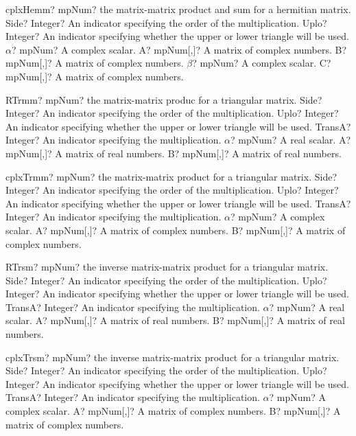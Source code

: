 \documentclass[12pt,a4paper,openany]{book}
\begin{document}
\begin{mpFunctionsExtract}
\mpFunctionSeven
{cplxHemm? mpNum? the matrix-matrix product and sum for a hermitian matrix.}
{Side? Integer? An indicator specifying the order of the multiplication.}
{Uplo? Integer? An indicator specifying whether the upper or lower triangle will be used.}
{$\alpha$? mpNum? A complex scalar.}
{A? mpNum[,]? A matrix of complex numbers.}
{B? mpNum[,]? A matrix of complex numbers.}
{$\beta$? mpNum? A complex scalar.}
{C? mpNum[,]? A matrix of complex numbers.}
\end{mpFunctionsExtract}

\begin{mpFunctionsExtract}
\mpFunctionSix
{RTrmm? mpNum? the matrix-matrix produc for a triangular matrix.}
{Side? Integer? An indicator specifying the order of the multiplication.}
{Uplo? Integer? An indicator specifying whether the upper or lower triangle will be used.}
{TransA? Integer? An indicator specifying the multiplication.}
{$\alpha$? mpNum? A real scalar.}
{A? mpNum[,]? A matrix of real numbers.}
{B? mpNum[,]? A matrix of real numbers.}
\end{mpFunctionsExtract}

\begin{mpFunctionsExtract}
\mpFunctionSix
{cplxTrmm? mpNum? the matrix-matrix product for a triangular matrix.}
{Side? Integer? An indicator specifying the order of the multiplication.}
{Uplo? Integer? An indicator specifying whether the upper or lower triangle will be used.}
{TransA? Integer? An indicator specifying the multiplication.}
{$\alpha$? mpNum? A complex scalar.}
{A? mpNum[,]? A matrix of complex numbers.}
{B? mpNum[,]? A matrix of complex numbers.}
\end{mpFunctionsExtract}

\begin{mpFunctionsExtract}
\mpFunctionSix
{RTrsm? mpNum? the inverse matrix-matrix product for a triangular matrix.}
{Side? Integer? An indicator specifying the order of the multiplication.}
{Uplo? Integer? An indicator specifying whether the upper or lower triangle will be used.}
{TransA? Integer? An indicator specifying the multiplication.}
{$\alpha$? mpNum? A real scalar.}
{A? mpNum[,]? A matrix of real numbers.}
{B? mpNum[,]? A matrix of real numbers.}
\end{mpFunctionsExtract}

\begin{mpFunctionsExtract}
\mpFunctionSix
{cplxTrsm? mpNum? the inverse matrix-matrix product for a triangular matrix.}
{Side? Integer? An indicator specifying the order of the multiplication.}
{Uplo? Integer? An indicator specifying whether the upper or lower triangle will be used.}
{TransA? Integer? An indicator specifying the multiplication.}
{$\alpha$? mpNum? A complex scalar.}
{A? mpNum[,]? A matrix of complex numbers.}
{B? mpNum[,]? A matrix of complex numbers.}
\end{mpFunctionsExtract}
\end{document}
